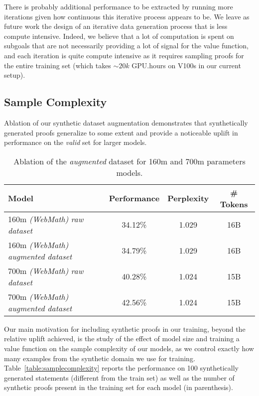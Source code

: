\documentclass{article}
\begin{document}
There is probably additional performance to be extracted by running more iterations given how continuous this iterative process appears to be. We leave as future work the design of an iterative data generation process that is less compute intensive. Indeed, we believe that a lot of computation is spent on subgoals that are not necessarily providing a lot of signal for the value function, and each iteration is quite compute intensive as it requires sampling proofs for the entire training set (which takes $\sim 20k$ GPU.hours on V100s in our current setup).

\subsection{Sample Complexity}
\label{section:samplecomplexity}

Ablation of our synthetic dataset augmentation demonstrates that synthetically generated proofs generalize to some extent and provide a noticeable uplift in performance on the \textit{valid} set for larger models.

\begin{table}[ht]
\caption{Ablation of the \textit{augmented} dataset for 160m and 700m parameters models.} 
\centering
\begin{tabular}{ |l|c|c|c| }
    \hline
    Model & Performance & Perplexity & \# Tokens \\
    \hline
    160m \textit{(WebMath)} \textit{raw dataset} & 34.12\% & 1.029 & 16B \\
    160m \textit{(WebMath)} \textit{augmented dataset} & 34.79\% & 1.029 & 16B \\
    700m \textit{(WebMath)} \textit{raw dataset} & 40.28\% & 1.024 & 15B \\
    700m \textit{(WebMath)} \textit{augmented dataset} & 42.56\% & 1.024 & 15B \\
    \hline
\end{tabular}
\label{table:augmentedabl}
\end{table}

Our main motivation for including synthetic proofs in our training, beyond the relative uplift achieved, is the study of the effect of model size and training a value function on the sample complexity of our models, as we control exactly how many examples from the synthetic domain we use for training. Table~\ref{table:samplecomplexity} reports the performance on 100 synthetically generated statements (different from the train set) as well as the number of synthetic proofs present in the training set for each model (in parenthesis).
\end{document}
